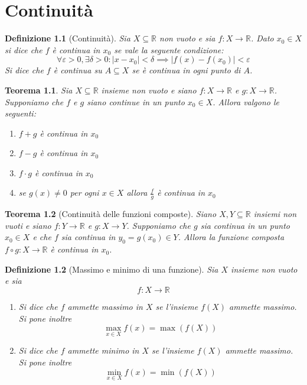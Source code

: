\documentclass[11pt]{book}
\newtheorem{theorem}{Teorema}[chapter]
\newtheorem{definition}{Definizione}[chapter]
\begin{document}
\chapter{Continuità}
\begin{definition}[Continuità]
    Sia $X\subseteq\mathbb{R}$ non vuoto e sia $f:X\rightarrow\mathbb{R}$. Dato $x_0\in X$ si dice che $f$ è continua in 
    $x_0$ se vale la seguente condizione:
    \begin{equation*}
        \forall\varepsilon>0,\exists\delta>0:|x-x_0|<\delta\implies|f(x)-f(x_0)|<\varepsilon
    \end{equation*}
    Si dice che $f$ è continua su $A\subseteq X$ se è continua in ogni punto di $A$.
\end{definition}
\begin{theorem}
    Sia $X\subseteq\mathbb{R}$ insieme non vuoto e siano $f:X\rightarrow\mathbb{R}$ e $g:X\rightarrow\mathbb{R}$. Supponiamo
    che $f$ e $g$ siano continue in un punto $x_0\in X$. Allora valgono le seguenti:
    \begin{enumerate}
        \item $f+g$ è continua in $x_0$
        \item $f-g$ è continua in $x_0$
        \item $f\cdot g$ è continua in $x_0$
        \item se $g(x)\neq 0$ per ogni $x\in X$ allora $\frac{f}{g}$ è continua in $x_0$
    \end{enumerate}
\end{theorem}
\begin{theorem}[Continuità delle funzioni composte]
    Siano $X,Y\subseteq\mathbb{R}$ insiemi non vuoti e siano $f:Y\rightarrow\mathbb{R}$ e $g:X\rightarrow Y$. Supponiamo 
    che $g$ sia continua in un punto $x_0\in X$ e che $f$ sia continua in $y_0=g(x_0)\in Y$. Allora la funzione composta 
    $f\circ g:X\rightarrow\mathbb{R}$ è continua in $x_0$.
\end{theorem}
\begin{definition}[Massimo e minimo di una funzione]
    Sia $X$ insieme non vuoto e sia 
    \begin{equation*}
        f:X\rightarrow\mathbb{R}
    \end{equation*}
    \begin{enumerate}
        \item Si dice che $f$ ammette massimo in $X$ se l'insieme $f(X)$ ammette massimo. Si pone inoltre 
        \begin{equation*}
            \max_{x\in X}f(x)=\max(f(X))
        \end{equation*}
        \item Si dice che $f$ ammette minimo in $X$ se l'insieme $f(X)$ ammette massimo. Si pone inoltre 
        \begin{equation*}
            \min_{x\in X}f(x)=\min(f(X))
        \end{equation*}
    \end{enumerate}
\end{definition}
\end{document}
